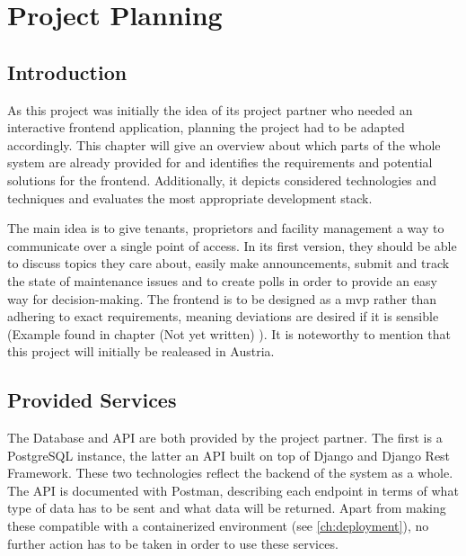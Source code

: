 \chapter[Project Planning]{Project Planning}

\section{Introduction}
As this project was initially the idea of its project partner who needed an interactive frontend application, planning the project had to be adapted accordingly. This chapter will give an overview about which parts of the whole system are already provided for and identifies the requirements and potential solutions for the frontend. Additionally, it depicts considered technologies and techniques and evaluates the most appropriate development stack.

The main idea is to give tenants, proprietors and facility management a way to communicate over a single point of access. In its first version, they should be able to discuss topics they care about, easily make announcements, submit and track the state of maintenance issues and to create polls in order to provide an easy way for decision-making. The frontend is to be designed as a \acrfull{mvp} rather than adhering to exact requirements, meaning deviations are desired if it is sensible (Example found in chapter (Not yet written) ). It is noteworthy to mention that this project will initially be realeased in Austria.

\section{Provided Services}
The Database and API are both provided by the project partner. The first is a PostgreSQL instance, the latter an API built on top of Django and Django Rest Framework. These two technologies reflect the backend of the system as a whole. The API is documented with Postman, describing each endpoint in terms of what type of data has to be sent and what data will be returned. Apart from making these compatible with a containerized environment (see \autoref{ch:deployment}), no further action has to be taken in order to use these services.

